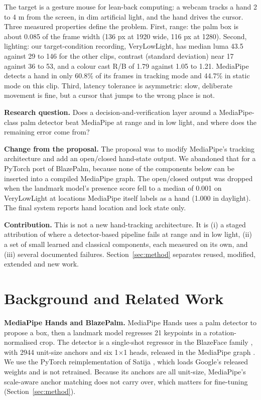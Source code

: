\documentclass[conference,a4paper]{IEEEtran}
\begin{document}
The target is a gesture mouse for lean-back computing: a webcam tracks a
hand 2 to 4 m from the screen, in dim artificial light, and the hand drives
the cursor. Three measured properties define the problem. First, range: the
palm box is about 0.085 of the frame width (136 px at 1920 wide, 116 px at
1280). Second, lighting: our target-condition recording, VeryLowLight, has
median luma 43.5 against 29 to 146 for the other clips, contrast (standard
deviation) near 17 against 36 to 53, and a colour cast R/B of 1.79 against
1.05 to 1.21. MediaPipe detects a hand in only 60.8\% of its frames in
tracking mode and 44.7\% in static mode on this clip. Third, latency
tolerance is asymmetric: slow, deliberate movement is fine, but a cursor
that jumps to the wrong place is not.

\textbf{Research question.} Does a decision-and-verification layer around a
MediaPipe-class palm detector beat MediaPipe at range and in low light, and
where does the remaining error come from?

\textbf{Change from the proposal.} The proposal was to modify MediaPipe's
tracking architecture and add an open/closed hand-state output. We
abandoned that for a PyTorch port of BlazePalm, because none of the
components below can be inserted into a compiled MediaPipe graph. The
open/closed output was dropped when the landmark model's presence score
fell to a median of 0.001 on VeryLowLight at locations MediaPipe itself
labels as a hand (1.000 in daylight). The final system reports hand
location and lock state only.

\textbf{Contribution.} This is not a new hand-tracking architecture. It is
(i) a staged attribution of where a detector-based pipeline fails at range
and in low light, (ii) a set of small learned and classical components,
each measured on its own, and (iii) several documented failures.
Section~\ref{sec:method} separates reused, modified, extended and new work.

\section{Background and Related Work}

\textbf{MediaPipe Hands and BlazePalm.} MediaPipe Hands \cite{mediapipe}
uses a palm detector to propose a box, then a landmark model regresses 21
keypoints in a rotation-normalised crop. The detector is a single-shot
regressor in the BlazeFace family \cite{blazeface}, with 2944 unit-size
anchors and six 1$\times$1 heads, released in the MediaPipe graph
\cite{mediapipe_github}. We use the PyTorch reimplementation of Satija
\cite{blazepalm_port}, which loads Google's released weights and is not
retrained. Because its anchors are all unit-size, MediaPipe's scale-aware
anchor matching does not carry over, which matters for fine-tuning
(Section~\ref{sec:method}).
\end{document}
